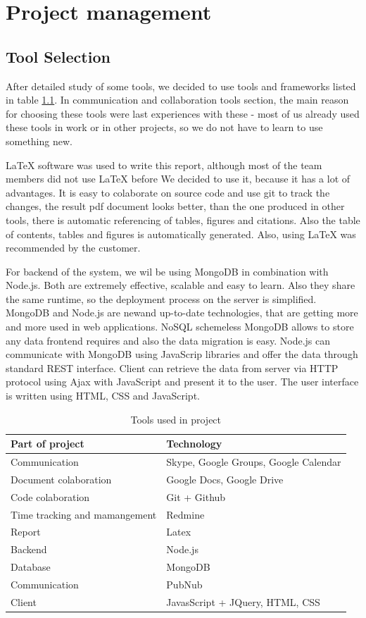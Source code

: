 \chapter{Project management}

\section{Tool Selection}
After detailed study of some tools, we decided to use tools and frameworks listed in table \ref{table-tools}. In communication and collaboration tools section, the main reason for choosing these tools were last experiences with these - most of us already used these tools in work or in other projects, so we do not have to learn to use something new. 

LaTeX software was used to write this report, although most of the team members did not use LaTeX before We decided to use it, because it has a lot of advantages. It is easy to colaborate on source code and use git to track the changes, the result pdf document looks better, than the one produced in other tools, there is automatic referencing of tables, figures and citations. Also the table of contents, tables and figures is automatically generated. Also, using LaTeX was recommended by the customer.

For backend of the system, we wil be using MongoDB in combination with Node.js. Both are extremely effective, scalable and easy to learn. Also they share the same runtime, so the deployment process on the server is simplified. MongoDB and Node.js are newand up-to-date technologies, that are getting more and more used in web applications. NoSQL schemeless MongoDB allows to store any data frontend requires and also the data migration is easy. Node.js can communicate with MongoDB using JavaScrip libraries and offer the data through standard REST interface. Client can retrieve the data from server via HTTP protocol using Ajax with JavaScript and present it to the user. The user interface is written using HTML, CSS and JavaScript.

\begin{table}
\centering
\begin{tabular}{ l l}
\textbf{Part of project}  & \textbf{Technology} \\
\hline
Communication & Skype, Google Groups, Google Calendar \\
Document colaboration & Google Docs, Google Drive \\
Code colaboration & Git + Github \\
Time tracking and mamangement & Redmine \\
Report & Latex \\
Backend & Node.js \\
Database & MongoDB \\
Communication & PubNub \\
Client & JavasScript + JQuery, HTML, CSS \\
\hline
\end{tabular}
\caption{Tools used in project}
\label{table-tools}
\end{table}

